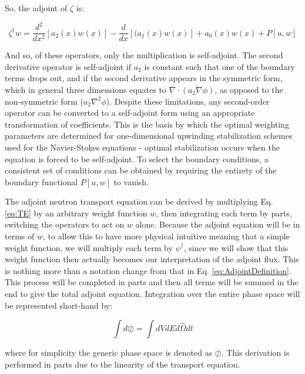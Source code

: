 \documentclass[10pt]{article}
\newcommand{\hO}{\hat{\Omega}}
\begin{document}
\begin{flushleft}
\begin{tcolorbox}[breakable]
So, the adjoint of \(\zeta\) is:

\begin{equation}
\zeta^\dagger w= \frac{d^2}{dx^2}\left\lbrack a_2(x)w(x)\right\rbrack -\frac{d}{dx}\left\lbrack(a_1(x)w(x)\right\rbrack+a_0(x)w(x)+P[u,w]
\end{equation}

And so, of these operators, only the multiplication is self-adjoint. The second derivative operator is self-adjoint if \(a_2\) is constant such that one of the boundary terms drops out, and if the second derivative appears in the symmetric form, which in general three dimensions equates to \(\nabla\cdot(a_2\nabla \phi)\), as opposed to the non-symmetric form (\(a_2\nabla^2 \phi\)). Despite these limitations, any second-order operator can be converted to a self-adjoint form using an appropriate transformation of coefficients. This is the basis by which the optimal weighting parameters are determined for one-dimensional upwinding stabilization schemes used for the Navier-Stokes equations - optimal stabilization occurs when the equation is forced to be self-adjoint. To select the boundary conditions, a consistent set of conditions can be obtained by requiring the entirety of the boundary functional \(P[u,w]\) to vanish. 
\end{tcolorbox}

The adjoint neutron transport equation can be derived by multiplying Eq. \ref{eq:TE} by an arbitrary weight function \(w\), then integrating each term by parts, switching the operators to act on \(w\) alone. Because the adjoint equation will be in terms of \(w\), to allow this to have more physical intuitive meaning that a simple weight function, we will multiply each term by \(\psi^\dagger\), since we will show that this weight function then actually becomes our interpretation of the adjoint flux. This is nothing more than a notation change from that in Eq. \ref{eq:AdjointDefinition}. This process will be completed in parts and then all terms will be summed in the end to give the total adjoint equation. Integration over the entire phase space will be represented short-hand by:

\begin{equation}
\label{eq:PhaseSpaceIntegration}
\int d\oslash = \int dVdEd\hO  dt
\end{equation}

where for simplicity the generic phase space is denoted as \(\oslash\). This derivation is performed in parts due to the linearity of the transport equation.


\end{flushleft}
\end{document}
